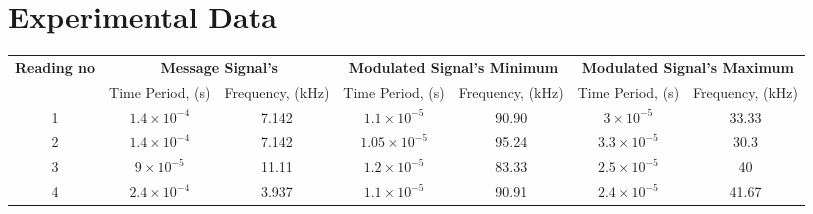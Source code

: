 \documentclass[12pt]{article}
\begin{document}
\section*{Experimental Data}
\begin{table}[H]
    \centering
    \begin{adjustbox}{width=\textwidth}
        \begin{tabular}{|c|c|c|c|c|c|c|}
            \hline
            \textbf{Reading no} & \multicolumn{2}{|c|}{\textbf{Message Signal's}} & \multicolumn{2}{|c|}{\textbf{Modulated Signal's Minimum}} & \multicolumn{2}{|c|}{\textbf{Modulated Signal's Maximum}}                                                                \\
            \cline{2-7}
                                & Time Period, (s)                                & Frequency, (kHz)                                          & Time Period, (s)                                          & Frequency, (kHz) & Time Period, (s)       & Frequency, (kHz) \\
            \hline
            1                   & \(1.4 \times 10^{-4}\)                          & 7.142                                                     & \(1.1 \times 10^{-5}\)                                    & 90.90            & \(3 \times 10^{-5}\)   & 33.33            \\
            \hline
            2                   & \(1.4 \times 10^{-4}\)                          & 7.142                                                     & \(1.05 \times 10^{-5}\)                                   & 95.24            & \(3.3 \times 10^{-5}\) & 30.3             \\
            \hline
            3                   & \(9 \times 10^{-5}\)                            & 11.11                                                     & \(1.2 \times 10^{-5}\)                                    & 83.33            & \(2.5 \times 10^{-5}\) & 40               \\
            \hline
            4                   & \(2.4 \times 10^{-4}\)                          & 3.937                                                     & \(1.1 \times 10^{-5}\)                                    & 90.91            & \(2.4 \times 10^{-5}\) & 41.67            \\
            \hline
        \end{tabular}
    \end{adjustbox}
\end{table}
\end{document}

